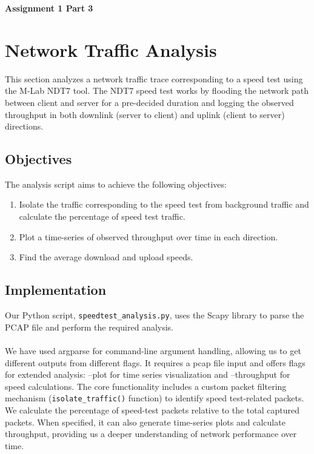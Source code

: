 \documentclass{article}
\begin{document}
\begin{center}
 \LARGE\bfseries Assignment 1 Part 3
\end{center}

\section{Network Traffic Analysis}

This section analyzes a network traffic trace corresponding to a speed test using the M-Lab NDT7 tool. The NDT7 speed test works by flooding the network path between client and server for a pre-decided duration and logging the observed throughput in both downlink (server to client) and uplink (client to server) directions.

\subsection{Objectives}

The analysis script aims to achieve the following objectives:

\begin{enumerate}
    \item Isolate the traffic corresponding to the speed test from background traffic and calculate the percentage of speed test traffic.
    \item Plot a time-series of observed throughput over time in each direction.
    \item Find the average download and upload speeds.
\end{enumerate}

\subsection{Implementation}

Our Python script, \texttt{speedtest\_analysis.py}, uses the Scapy library to parse the PCAP file and perform the required analysis.
\\\\
We have used argparse for command-line argument handling, allowing us to get different outputs from different flags. It requires a pcap file input and offers flags for extended analysis: --plot for time series visualization and --throughput for speed calculations. The core functionality includes a custom packet filtering mechanism (\texttt{isolate\_traffic()} function) to identify speed test-related packets. We calculate the percentage of speed-test packets relative to the total captured packets. When specified, it can also generate time-series plots and calculate throughput, providing us a deeper understanding of network performance over time.
\end{document}
